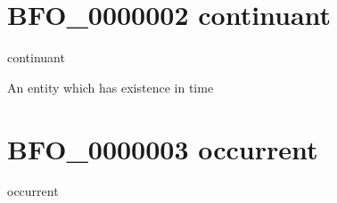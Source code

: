 \documentclass[letterpaper,10pt,english]{sphinxmanual}
\begin{document}
\begin{sphinxShadowBox}

\sphinxAtStartPar
{}
\end{sphinxShadowBox}
\begin{quote}
\label{\detokenize{doc-BFO_0000002:bfo-0000002}}\label{\detokenize{doc-BFO_0000002:continuant}}\label{\detokenize{doc-BFO_0000002:bfo-0000002}}
\ignorespaces \end{quote}


\section{BFO\_0000002 \sphinxhyphen{} continuant}
\label{\detokenize{doc-BFO_0000002:bfo-0000002-continuant}}\label{\detokenize{doc-BFO_0000002:index-0}}\label{\detokenize{doc-BFO_0000002::doc}}
\begin{sphinxShadowBox}

\sphinxAtStartPar
continuant
\end{sphinxShadowBox}

\begin{sphinxShadowBox}

\sphinxAtStartPar
An entity which has existence in time
\end{sphinxShadowBox}

\begin{sphinxShadowBox}

\sphinxAtStartPar
{}
\end{sphinxShadowBox}
\begin{quote}
\label{\detokenize{doc-BFO_0000003:bfo-0000003}}\label{\detokenize{doc-BFO_0000003:occurrent}}\label{\detokenize{doc-BFO_0000003:bfo-0000003}}
\ignorespaces \end{quote}


\section{BFO\_0000003 \sphinxhyphen{} occurrent}
\label{\detokenize{doc-BFO_0000003:bfo-0000003-occurrent}}\label{\detokenize{doc-BFO_0000003:index-0}}\label{\detokenize{doc-BFO_0000003::doc}}
\begin{sphinxShadowBox}

\sphinxAtStartPar
occurrent
\end{sphinxShadowBox}
\end{document}
